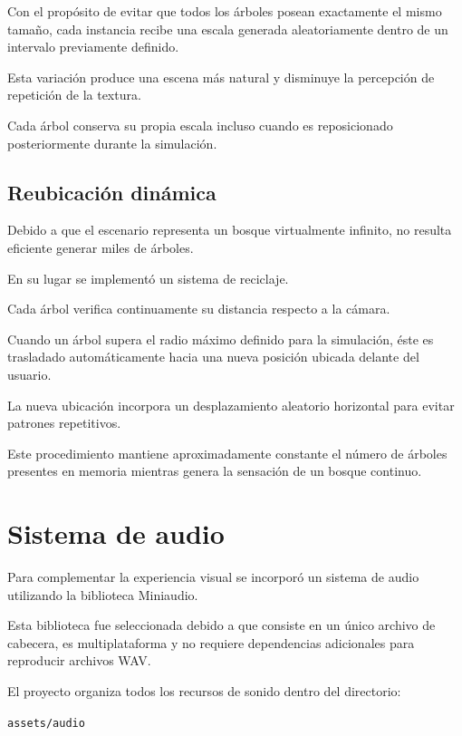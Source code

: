 Con el propósito de evitar que todos los árboles posean exactamente el mismo tamaño, cada instancia recibe una escala generada aleatoriamente dentro de un intervalo previamente definido.

Esta variación produce una escena más natural y disminuye la percepción de repetición de la textura.

Cada árbol conserva su propia escala incluso cuando es reposicionado posteriormente durante la simulación.

\subsection{Reubicación dinámica}

Debido a que el escenario representa un bosque virtualmente infinito, no resulta eficiente generar miles de árboles.

En su lugar se implementó un sistema de reciclaje.

Cada árbol verifica continuamente su distancia respecto a la cámara.

Cuando un árbol supera el radio máximo definido para la simulación, éste es trasladado automáticamente hacia una nueva posición ubicada delante del usuario.

La nueva ubicación incorpora un desplazamiento aleatorio horizontal para evitar patrones repetitivos.

Este procedimiento mantiene aproximadamente constante el número de árboles presentes en memoria mientras genera la sensación de un bosque continuo.


\section{Sistema de audio}

Para complementar la experiencia visual se incorporó un sistema de audio utilizando la biblioteca Miniaudio.

Esta biblioteca fue seleccionada debido a que consiste en un único archivo de cabecera, es multiplataforma y no requiere dependencias adicionales para reproducir archivos WAV.

El proyecto organiza todos los recursos de sonido dentro del directorio:

\begin{center}

\texttt{assets/audio}

\end{center}

